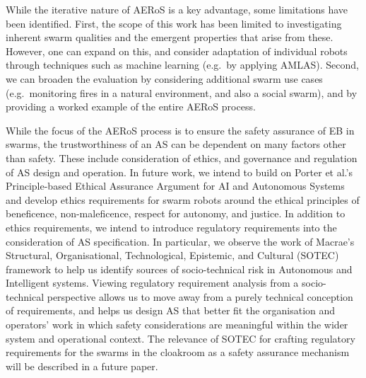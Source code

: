 \documentclass[runningheads]{llncs}
\begin{document}
While the iterative nature of AERoS is a key advantage, some limitations have been identified. 
First, the scope of this work has been limited to investigating inherent swarm qualities and the emergent properties that arise from these. 
However, one can expand on this, and consider adaptation of individual robots through techniques such as machine learning (e.g.\ by applying AMLAS).
Second, we can broaden the evaluation by considering additional swarm use cases (e.g.\ monitoring fires in a natural environment, and also a social swarm), and by providing a worked example of the entire AERoS process.

While the focus of the AERoS process is to ensure the safety assurance of EB in swarms, the trustworthiness of an AS can be dependent on many factors other than safety. These include consideration of ethics, and governance and regulation of AS design and operation. 
In future work, we intend to build on Porter et al.’s \cite{Porter2022} Principle-based Ethical Assurance Argument for AI and Autonomous Systems and develop ethics requirements for swarm robots around the ethical principles of beneficence, non-maleficence, respect for autonomy, and justice. 
In addition to ethics requirements, we intend to introduce regulatory requirements into the consideration of AS specification. In particular, we observe the work of Macrae’s~\cite{macrae2021learning} Structural, Organisational, Technological, Epistemic, and Cultural (SOTEC) framework to help us identify sources of socio-technical risk in Autonomous and Intelligent systems. Viewing regulatory requirement analysis from a socio-technical perspective allows us to move away from a purely technical conception of requirements, and helps us design AS that better fit the organisation and operators’ work in which safety considerations are meaningful within the wider system and operational context. The relevance of SOTEC for crafting regulatory requirements for the swarms in the cloakroom as a safety assurance mechanism will be described in a future paper. 
\end{document}

